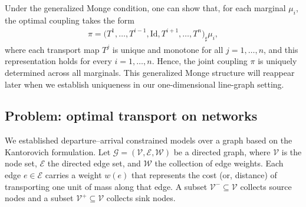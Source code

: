\documentclass[11pt]{article}
\newcommand{\calV}{{\mathcal V}}
\newcommand{\calE}{{\mathcal E}}
\newcommand{\calG}{{\mathcal G}}
\newcommand{\calW}{{\mathcal W}}
\begin{document}
Under the generalized Monge condition, one can show that, for each marginal $\mu_i$, the optimal coupling takes the form
\begin{align*}
\pi = \big(T^1,\dots,T^{i-1},\mathrm{Id},T^{i+1},\dots,T^n\big)_{\sharp}\mu_i,
\end{align*}
where each transport map $T^j$ is unique and monotone for all $j = 1,\dots,n$, and this representation holds for every $i = 1,\dots,n$. Hence, the joint coupling $\pi$ is uniquely determined across all marginals. This generalized Monge structure will reappear later when we establish uniqueness in our one-dimensional line-graph setting.



\subsection{Problem: optimal transport on networks}

We established departure--arrival constrained models over a graph based on the Kantorovich formulation. Let $\calG=(\calV,\calE,\calW)$ be a directed graph, where $\calV$ is the node set, $\calE$ the directed edge set, and $\calW$ the collection of edge weights. Each edge $e\in\calE$ carries a weight $w(e)$ that represents the cost (or, distance) of transporting one unit of mass along that edge. A subset $\calV^- \subseteq \calV$ collects source nodes and a subset $\calV^+ \subseteq \calV$ collects sink nodes.
\end{document}
